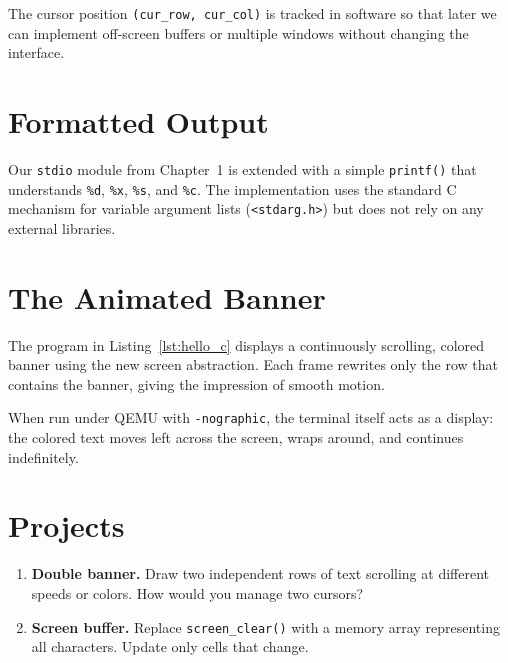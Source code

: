 The cursor position \texttt{(cur\_row, cur\_col)} is tracked in software so that
later we can implement off-screen buffers or multiple windows without changing
the interface.

\section{Formatted Output}

Our \texttt{stdio} module from Chapter~1 is extended with a simple
\texttt{printf()} that understands \texttt{\%d}, \texttt{\%x}, \texttt{\%s},
and \texttt{\%c}.  The implementation uses the standard C mechanism for
variable argument lists (\texttt{<stdarg.h>}) but does not rely on any external
libraries.

\begin{figure}[H]
\centering
\begin{minipage}{0.9\textwidth}

\end{minipage}
\end{figure}

\section{The Animated Banner}

The program in Listing~\ref{lst:hello_c} displays a continuously scrolling,
colored banner using the new screen abstraction.  Each frame rewrites only the
row that contains the banner, giving the impression of smooth motion.

\begin{figure}[H]
\centering
\begin{minipage}{0.9\textwidth}

\end{minipage}
\end{figure}

When run under QEMU with \texttt{-nographic}, the terminal itself acts as a
display: the colored text moves left across the screen, wraps around, and
continues indefinitely.

\section{Projects}

\begin{enumerate}
  \item \textbf{Double banner.}
        Draw two independent rows of text scrolling at different speeds or
        colors.  How would you manage two cursors?
  \item \textbf{Screen buffer.}
        Replace \texttt{screen\_clear()} with a memory array representing all
        characters.  Update only cells that change.
\end{enumerate}
